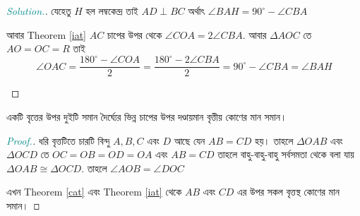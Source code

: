 \documentclass[a4paper,11pt]{article}
\newcommand{\drg}{^{\circ}}
\newenvironment{sltn}{\begin{proof}[\emph{\textcolor{darkcyan}{Solution.}}]} {\end{proof}}
\newenvironment{prf}{\begin{proof}[\emph{\textcolor{darkcyan}{Proof.}}]} {\end{proof}}
\begin{document}
\begin{sltn} যেহেতু $H$ হল লম্বকেন্দ্র তাই $AD \perp BC$ অর্থাৎ $\angle BAH=90\drg-\angle CBA$
	
	আবার Theorem \ref{iat} $AC$ চাপের উপর থেকে $\angle COA=2\angle CBA$. আবার $\Delta AOC$ তে $AO=OC=R$ তাই 
	\[\angle OAC=\dfrac{180\drg-\angle COA}{2}=\dfrac{180\drg-2\angle CBA}{2}=90\drg-\angle CBA=\angle BAH\]
	\begin{center}
	\end{center}
\end{sltn}
\begin{col}
	\label{smarc}
	একটি বৃত্তের উপর দুইটি সমান দৈর্ঘ্যের ভিন্ন চাপের উপর দণ্ডায়মান বৃত্তীয় কোণের মান সমান। 
\end{col}
\begin{prf} ধরি বৃত্তটিতে চারটি বিন্দু $A,B,C$ এবং $D$ আছে যেন $AB=CD$ হয়। তাহলে $\Delta OAB$ এবং $\Delta OCD$ তে $OC=OB=OD=OA$ এবং $AB=CD$ তাহলে বাহু-বাহু-বাহু সর্বসমতা থেকে বলা যায় $\Delta OAB \cong \Delta OCD$. তাহলে $\angle AOB= \angle DOC$
	\begin{center}
	\end{center}
	এখন Theorem \ref{cat} এবং Theorem \ref{iat} থেকে $AB$ এবং $CD$ এর উপর সকল বৃত্তস্থ কোণের মান সমান। 
\end{prf}
\end{document}

